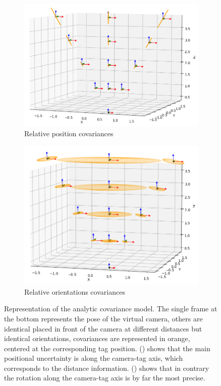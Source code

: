 \begin{figure}[h]
    \centering
    \begin{subfigure}{.49\linewidth}
        \centering
        \includegraphics[width=\textwidth]{figures/apriltag_cov_posi.png}
        \caption{Relative position covariances \label{fig:apriltag_cov_posi}}
    \end{subfigure}%
    \hfill
    \begin{subfigure}{.49\linewidth}
        \centering
        \includegraphics[width=\textwidth]{figures/apriltag_cov_orientation.png}
        \caption{Relative orientations covariances \label{fig:apriltag_cov_orientation}}
    \end{subfigure}%
    \caption{Representation of the analytic covariance model. The single frame at the bottom represents the pose of the virtual camera, others are identical 
    \apriltags placed in front of the camera at different distances but identical orientations, covariances are represented in orange, centered at the corresponding tag position.
    () shows that the main positional uncertainty is along the camera-tag axis, which corresponds to the distance information. 
    () shows that in contrary the rotation along the camera-tag axis is by far the most precise.}
    \label{fig:apriltag_cov}
\end{figure}

